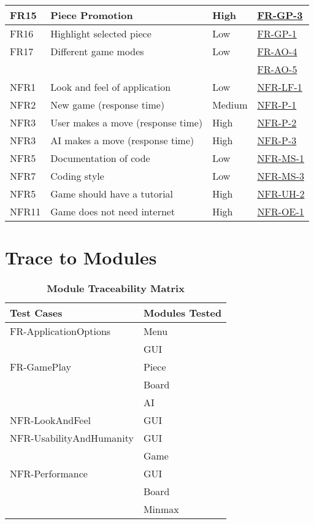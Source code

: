 \documentclass[12pt, titlepage]{article}
\begin{document}
\begin{table}[H]
\begin{center}
\begin{adjustwidth}{-1.5cm}{}
\begin{tabularx}{1.2\textwidth}{|p{3.4cm}|p{7cm}|p{1.6cm}|X|}
		\hline
		FR15 & Piece Promotion & High & \hyperref[FR-GP-3]{FR-GP-3}\\
		\hline
		FR16 & Highlight selected piece & Low & \hyperref[FR-GP-1/2]{FR-GP-1}\\
		\hline
		FR17 & Different game modes & Low & \hyperref[FR-AO-4]{FR-AO-4}\\
	     &  &  & \hyperref[FR-AO-5]{FR-AO-5}\\
		\hline
		\hline
		NFR1 & Look and feel of application & Low & \hyperref[NFR-LF-1]{NFR-LF-1}\\
		\hline
		NFR2 & New game (response time) & Medium & \hyperref[NFR-P-1]{NFR-P-1} \\
		\hline
		NFR3 & User makes a move (response time) & High & \hyperref[NFR-P-2]{NFR-P-2} \\
		\hline
		NFR3 & AI makes a move (response time) & High &\hyperref[NFR-P-3]{NFR-P-3}  \\
		\hline
		NFR5 & Documentation of code & Low & \hyperref[NFR-MS-1]{NFR-MS-1} \\
		\hline
		NFR7 & Coding style & Low & \hyperref[NFR-MS-3]{NFR-MS-3} \\
		\hline
		NFR5 & Game should have a tutorial & High & \hyperref[NFR-UH-2]{NFR-UH-2}\\
		\hline
		NFR11 & Game does not need internet & High & \hyperref[NFR-OE-1]{NFR-OE-1}\\
		\hline
	\end{tabularx}
	\end{adjustwidth}
	\end{center}
\end{table}

\section{Trace to Modules}		
\begin{table}[H]
    \begin{center}
	\caption{\bf Module Traceability Matrix}
	\begin{adjustwidth}{-1.5cm}{}
	\begin{tabularx}{1.2\textwidth}{|p{8cm}|X|}
		\hline 
		{\bf Test Cases}  & {\bf Modules Tested} \\
		\hline
		FR-ApplicationOptions & Menu\\
		& GUI\\
		\hline
		FR-GamePlay & Piece\\
		& Board\\
		& AI\\
		\hline
		NFR-LookAndFeel & GUI\\
		\hline
		NFR-UsabilityAndHumanity& GUI\\
		& Game\\
		\hline
		NFR-Performance & GUI\\
		& Board\\
		& Minmax\\
		\hline
	\end{tabularx}
	\end{adjustwidth}
	\end{center}
\end{table}
\end{document}
